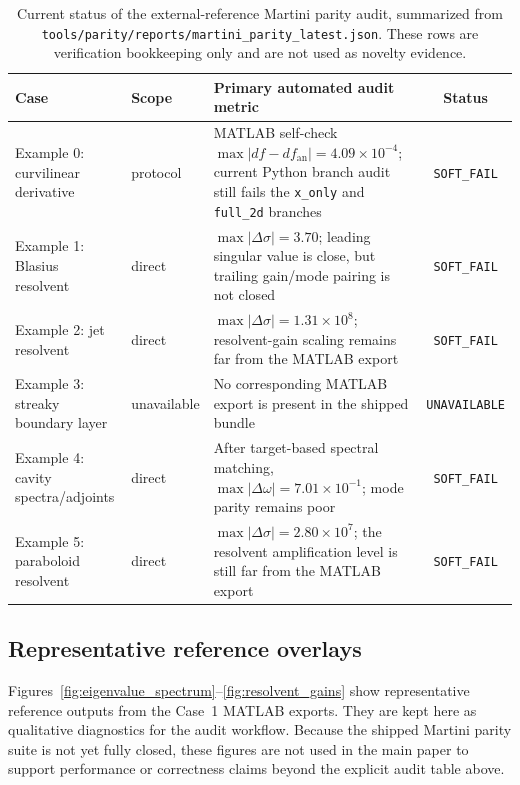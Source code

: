 \documentclass[11pt]{article}
\begin{document}
\begin{table}[t]
\centering
\scriptsize
\setlength{\tabcolsep}{4pt}
\begin{tabular}{L{3.0cm}L{1.8cm}L{6.0cm}c}
\toprule
Case & Scope & Primary automated audit metric & Status \\
\midrule
Example 0: curvilinear derivative & protocol & MATLAB self-check $\max|df-df_{\mathrm{an}}| = 4.09\times 10^{-4}$; current Python branch audit still fails the \texttt{x\_only} and \texttt{full\_2d} branches & \texttt{SOFT\_FAIL} \\
Example 1: Blasius resolvent & direct & $\max|\Delta \sigma| = 3.70$; leading singular value is close, but trailing gain/mode pairing is not closed & \texttt{SOFT\_FAIL} \\
Example 2: jet resolvent & direct & $\max|\Delta \sigma| = 1.31\times 10^{8}$; resolvent-gain scaling remains far from the MATLAB export & \texttt{SOFT\_FAIL} \\
Example 3: streaky boundary layer & unavailable & No corresponding MATLAB export is present in the shipped  bundle & \texttt{UNAVAILABLE} \\
Example 4: cavity spectra/adjoints & direct & After target-based spectral matching, $\max|\Delta \omega| = 7.01\times 10^{-1}$; mode parity remains poor & \texttt{SOFT\_FAIL} \\
Example 5: paraboloid resolvent & direct & $\max|\Delta \sigma| = 2.80\times 10^{7}$; the resolvent amplification level is still far from the MATLAB export & \texttt{SOFT\_FAIL} \\
\bottomrule
\end{tabular}
\caption{Current status of the external-reference Martini parity audit, summarized from \texttt{tools/parity/reports/martini\_parity\_latest.json}. These rows are verification bookkeeping only and are not used as novelty evidence.}
\label{tab:accuracy_gate}
\end{table}

\subsection{Representative reference overlays}
\label{sec:resolvent_validation}

Figures~\ref{fig:eigenvalue_spectrum}--\ref{fig:resolvent_gains} show representative reference outputs from the Case~1 MATLAB exports.
They are kept here as qualitative diagnostics for the audit workflow.
Because the shipped Martini parity suite is not yet fully closed, these figures are not used in the main paper to support performance or correctness claims beyond the explicit audit table above.
\end{document}
